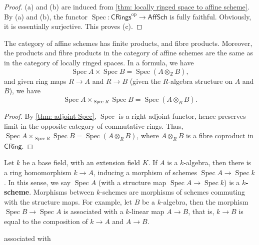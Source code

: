\documentclass[11pt]{article}
\newcommand{\Spec}{\operatorname{Spec}}
\begin{document}
\begin{proof}
    (a) and (b) are induced from \autoref{thm: locally ringed space to affine scheme}. 
    By (a) and (b), the functor $ \Spec:\mathsf{CRings}^{\operatorname{op}} \to  \mathsf{AffSch} $ 
    is fully faithful. Obviously, it is essentially surjective. This proves (c). 
\end{proof}

\begin{corollary}
    \label{cor: fibre product of affine schemes}
    \cite[\href{https://stacks.math.columbia.edu/tag/01I4}{Lemma 01I4}]{stacks} 
    The category of affine schemes has finite products, and fibre products. 
    Moreover, the products and fibre products in the category of affine schemes are the same as 
    in the category of locally ringed spaces. 
    In a formula, we have 
    $$ \Spec A \times \Spec B = \Spec (A \otimes_{\mathbb{Z}} B),$$
    and given ring maps $ R \to A $ and $ R \to B $ (given the $ R $-algebra structure on $ A $ and $ B $), 
    we have 
    $$ \Spec A \times_{\Spec R} \Spec B = \Spec (A \otimes_{R} B).$$
\end{corollary}

\begin{proof}
    By \autoref{thm: adjoint Spec}, $ \Spec $ is a right adjoint functor, 
    hence preserves limit in the opposite category of commutative rings. 
    Thus, $ \Spec A \times_{\Spec R} \Spec B = \Spec (A \otimes_{R} B)  $, 
    where $ A \otimes_{R} B $ is a fibre coproduct in $ \mathsf{CRing} $. 
\end{proof}

Let $ k $ be a base field, with an extension field $ K $. If $ A $ is a $ k $-algebra, 
then there is a ring homomorphism $ k \to A $, inducing a morphism of schemes $ \Spec A \to \Spec k $. 
In this sense, we say $ \Spec A $ (with a structure map $ \Spec A \to \Spec k $) is a \textbf{$ k $-scheme}. 
Morphisms between $ k $-schemes are morphisms of schemes commuting with the structure maps. 
For example, let $ B $ be a $ k $-algebra, then the morphism $ \Spec B \to \Spec A$ is associated with 
a $ k $-linear map $ A \to B $, that is, $ k \to B $ is equal to the composition of $ k \to A $ and $ A \to B $. 
\begin{center}
    associated with 
\end{center}
\end{document}
